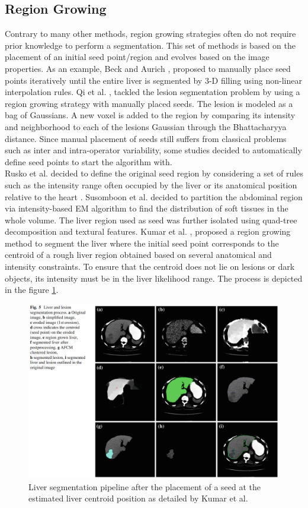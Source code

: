 \documentclass[]{article}
\begin{document}
\subsection*{Region Growing}

Contrary to many other methods, region growing strategies often do not
require prior knowledge to perform a segmentation. This set of methods
is based on the placement of an initial seed point/region and evolves
based on the image properties. As an example, Beck and Aurich \cite{Beck2007}, proposed to manually place seed points iteratively
until the entire liver is segmented by 3-D filling using non-linear
interpolation rules.
Qi et al. \cite{Qi2008}, tackled the lesion segmentation problem by using a region
growing strategy with manually placed seeds. The lesion is modeled as a
bag of Gaussians. A new voxel is added to the region by comparing its
intensity and neighborhood to each of the lesions Gaussian through the
Bhattacharyya distance.
Since manual placement of seeds still suffers from classical problems
such as inter and intra-operator variability, some studies decided to
automatically define seed points to start the algorithm with.\\
Rusko et al. 
decided to define the original seed region by considering a set of rules
such as the intensity range often occupied by the liver or its
anatomical position relative to the heart \cite{Rusko2007, Rusko2009}.
Susomboon et al. \cite{Susomboon2007} decided to partition the abdominal region via intensity-based
EM algorithm to find the distribution of soft tissues in the whole
volume. The liver region used as seed was further isolated using
quad-tree decomposition and textural features.
Kumar et al. \cite{Kumar2013}, proposed a region growing method to segment the liver where the
initial seed point corresponds to the centroid of a rough liver region
obtained based on several anatomical and intensity constraints. To
ensure that the centroid does not lie on lesions or dark objects, its
intensity must be in the liver likelihood range. The process is depicted
 in the figure \ref{Kumar2013_Fig5}.

\begin{figure}[ht!]
	\centering
	\includegraphics[width=0.7\linewidth]{images/image19}
	\caption{Liver segmentation pipeline after the placement of a seed at the estimated liver centroid position as detailed by Kumar et al. \cite{Kumar2013}}
	\label{Kumar2013_Fig5}
\end{figure}
\end{document}

